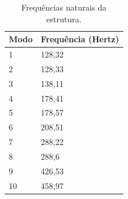 \begin{table}[!h]
\centering
\caption{Frequências naturais da estrutura.}
\label{tab:frequencias}
\begin{tabular}{|l|l|}
\hline
\multicolumn{1}{|c|}{\textbf{Modo}}    & \multicolumn{1}{c|}{\textbf{Frequência (Hertz)}} \\ \hline
1        					   & 128,32          \\ \hline
2       					   & 128,33         \\ \hline
3            				   & 138,11          \\ \hline
4        					   & 178,41          \\ \hline
5       					   & 178,57          \\ \hline
6            				   & 208,51          \\ \hline
7       					   & 288,22          \\ \hline
8            				   & 288,6          \\ \hline
9       					   & 426,53         \\ \hline
10           				   & 458,97          \\ \hline
\end{tabular}
\end{table}